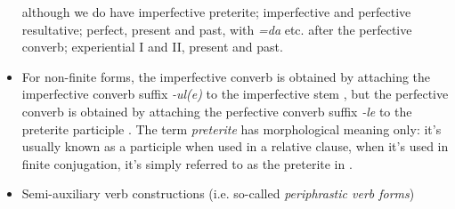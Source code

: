 \documentclass[a4paper, oneside, 12pt]{report}
\newcommand*{\citepage}[1]{p.~{#1}}
\newcommand*{\term}[1]{\emph{#1}}
\newcommand{\form}[1]{\emph{#1}}
\begin{document}
\begin{itemize}
    although we do have imperfective preterite;
    imperfective and perfective resultative; 
    perfect, present and past, with \form{=da} etc. after the perfective converb; 
    experiential I and II, present and past. 
    \item For non-finite forms, the imperfective converb 
    is obtained by attaching the imperfective converb suffix \form{-ul(e)} to the imperfective stem
    \citep[\citepage{306}]{forker2020grammar},
    but the perfective converb is obtained by 
    attaching the perfective converb suffix \form{-le} to the preterite participle 
    \citep[\citepage{308}]{forker2020grammar}.
    The term \term{preterite} has morphological meaning only:
    it's usually known as a participle when used in a relative clause, 
    when it's used in finite conjugation, 
    it's simply referred to as the preterite in \citet{forker2020grammar}.
    \item Semi-auxiliary verb constructions (i.e. so-called \term{periphrastic verb forms})
\end{itemize}
\end{document}
